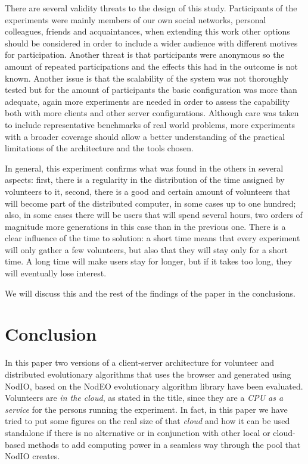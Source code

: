 \documentclass[journal,onecolumn]{IEEEtran}
\begin{document}
There are several validity threats to the design of this study.
Participants of the experiments were mainly members of our 
own social networks, personal colleagues, friends 
and acquaintances, when extending this work other options 
should be considered in order to include 
a wider audience with different motives for participation.
Another threat is that participants were anonymous so the amount of repeated 
participations and the effects this had in the outcome is not
known. Another issue is that the scalability of the system was not thoroughly tested
but for the amount of participants the basic configuration 
was more than adequate, again more experiments are needed in order
to assess the capability both with more clients and other server
configurations. Although care was taken to include representative benchmarks
of real world problems, more experiments with a broader coverage 
should allow a better understanding of the practical limitations of
the architecture and the tools chosen.


In general, this experiment confirms what was found in the others in
several aspects: first, there is a regularity in the distribution of the
time assigned by volunteers to it, second, there is a good and certain
amount of volunteers that will become part of the distributed
computer, in some cases up to one hundred; also, in some cases there
will be users that will spend several hours, two orders of magnitude
more generations in this case than in the previous one. There is a
clear influence of the time to solution: a short time means that every
experiment will only gather a few volunteers, but also that they will
stay only for a short time. A long time will make users stay for
longer, but if it takes too long, they will eventually lose interest. 

We will discuss this and the rest of the findings of the paper in the
conclusions. 

\section{Conclusion}
\label{sec:conclusion}

In this paper two versions of a client-server architecture for volunteer and distributed
evolutionary algorithms that uses the browser and generated using {\sf
  NodIO}, based on the {\sf NodEO} evolutionary algorithm library have been
evaluated. Volunteers are {\em in the cloud}, as stated in the title,
since they are a {\em CPU as a service} for the persons running the
experiment. In fact, in this paper we have tried to put some figures
on the real size of that {\em cloud} and how it can be used standalone
if there is no alternative or in conjunction with other local or
cloud-based methods to add computing power in a seamless way through
the pool that NodIO creates. 
\end{document}
